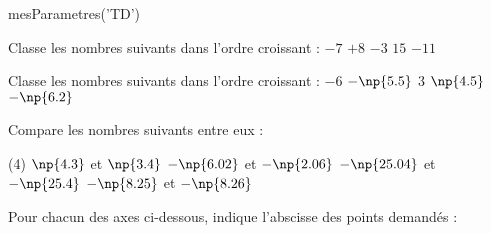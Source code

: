 \documentclass[../Chapitre2.tex]{subfiles}
\begin{document}

\begin{luacode}
  mesParametres('TD')
\end{luacode}
\parametrage



\begin{enonce}
  Classe les nombres suivants dans l'ordre croissant : \hfill $-7$ \hfill $+8$ \hfill $-3$ \hfill $15$ \hfill $-11$
\end{enonce}


\begin{enonce}
  Classe les nombres suivants dans l'ordre croissant : \hfill $-6$ \hfill $-\np{5.5}$ \hfill $3$ \hfill $\np{4.5}$ \hfill $-\np{6.2}$
\end{enonce}



\begin{enonce}
  Compare les nombres suivants entre eux :

  \begin{tasks}[style=itemize](4)
    \task $\np{4.3}$ et $\np{3.4}$
    \task $-\np{6.02}$ et $-\np{2.06}$
    \task $-\np{25.04}$ et $-\np{25.4}$
    \task $-\np{8.25}$ et $-\np{8.26}$
  \end{tasks}
\end{enonce}



\begin{enonce}
Pour chacun des axes ci-dessous, indique l'abscisse des points demandés :

\bigskip

  \hfill{}

\vspace{1cm}

\hfill{}

\end{enonce}
\end{document}
